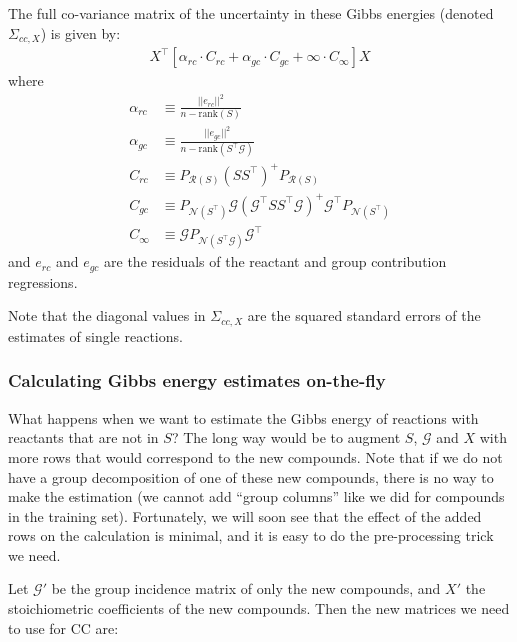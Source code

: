 \documentclass[twocolumn]{article}
\newcommand{\Gmat}{\mathcal{G}}
\newcommand{\PRmat}[1]{P_{\mathcal{R}\left(#1\right)}}
\newcommand{\PNmat}[1]{P_{\mathcal{N}\left(#1\right)}}
\begin{document}
The full co-variance matrix of the uncertainty in these Gibbs energies (denoted $\Sigma_{cc,X}$) is given by:
\begin{align}
X^{\top} \left[ \alpha_{rc}\cdot C_{rc} + \alpha_{gc}\cdot C_{gc} + \infty\cdot C_{\infty}  \right] X \label{eq:full_u}
\end{align}
where
\begin{align*}
\alpha_{rc} &\equiv \frac{||e_{rc}||^{2}}{n-\mbox{rank}(S)} \\
\alpha_{gc} &\equiv \frac{||e_{gc}||^{2}}{n-\mbox{rank}(S^{\top}\Gmat)} \\
C_{rc} & \equiv \PRmat{S} \left(SS^{\top}\right)^{+} \PRmat{S} \label{eq:c_rc}\\
C_{gc} & \equiv \PNmat{S^\top} \Gmat \left(\Gmat^{\top}SS^{\top}\Gmat\right)^{+} \Gmat^{\top} \PNmat{S^\top} \\
C_{\infty} & \equiv \Gmat \PNmat{S^\top\Gmat} \Gmat^{\top}
\end{align*}
and $e_{rc}$ and $e_{gc}$ are the residuals of the reactant and group contribution regressions.

Note that the diagonal values in $\Sigma_{cc,X}$ are the squared standard errors of the estimates of single reactions.


\subsubsection{Calculating Gibbs energy estimates on-the-fly}

What happens when we want to estimate the Gibbs energy of reactions with reactants that are not in $S$? The long way would be to augment $S$, $\Gmat$ and $X$ with more rows that would correspond to the new compounds. Note that if we do not have a group decomposition of one of these new compounds, there is no way to make the estimation (we cannot add ``group columns'' like we did for compounds in the training set). Fortunately, we will soon see that the effect of the added rows on the calculation is minimal, and it is easy to do the pre-processing trick we need.

Let $\Gmat'$ be the group incidence matrix of only the new compounds, and $X'$ the stoichiometric coefficients of the new compounds. Then the new matrices we need to use for CC are:
\end{document}
